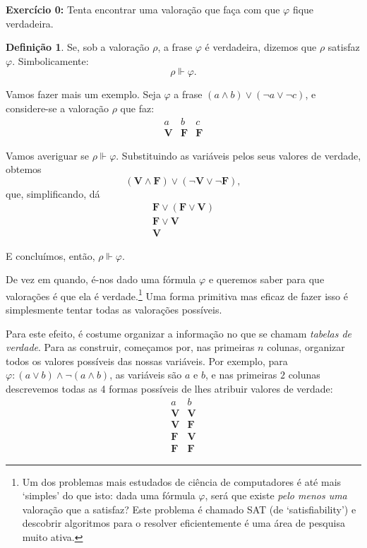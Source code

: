 \documentclass{article}
\theoremstyle{definition}
\newtheorem{definicao}{Definição}
\theoremstyle{remark}
\newcommand{\V}{\mathbf{V}}
\newcommand{\F}{\mathbf{F}}
\begin{document}
	\textbf{Exercício 0:} Tenta encontrar uma valoração que faça com que $\varphi$ fique verdadeira.
	
	\begin{definicao}
	Se, sob a valoração $\rho$, a frase $\varphi$ é verdadeira, dizemos que $\rho$ satisfaz $\varphi$. Simbolicamente:
	\[\rho \Vdash \varphi.\]
	\end{definicao}
	
	Vamos fazer mais um exemplo. Seja $\varphi$ a frase $(a \land b) \lor (\neg a \lor \neg c)$, e considere-se a valoração $\rho$ que faz:
	\[
	\begin{array}{c|c|c}
	a & b & c\\
	\hline
	\V & \F & \F
	\end{array}
	\]
	
	Vamos averiguar se $\rho \Vdash \varphi$. Substituindo as variáveis pelos seus valores de verdade, obtemos
	\[(\V \land \F) \lor (\neg \V \lor \neg \F),\]
	que, simplificando, dá
	\begin{gather*}
	\F \lor (\F \lor \V)\\
	\F \lor \V\\
	\V
	\end{gather*}
	
	E concluímos, então, $\rho \Vdash \varphi$.
	
	\smallskip
	
	De vez em quando, é-nos dado uma fórmula $\varphi$ e queremos saber para que valorações é que ela é verdade.\footnote{Um dos problemas mais estudados de ciência de computadores é até mais `simples' do que isto: dada uma fórmula $\varphi$, será que existe \emph{pelo menos uma} valoração que a satisfaz? Este problema é chamado SAT (de `satisfiability') e descobrir algoritmos para o resolver eficientemente é uma área de pesquisa muito ativa.} Uma forma primitiva mas eficaz de fazer isso é simplesmente tentar todas as valorações possíveis.
	
	Para este efeito, é costume organizar a informação no que se chamam \emph{tabelas de verdade}. Para as construir, começamos por, nas primeiras $n$ colunas, organizar todos os valores possíveis das nossas variáveis. Por exemplo, para $\varphi: (a \lor b) \land \neg (a \land b)$, as variáveis são $a$ e $b$, e nas primeiras $2$ colunas descrevemos todas as 4 formas possíveis de lhes atribuir valores de verdade:
	\[
	\begin{array}{c|c}
	a & b\\
	\hline
	\V & \V\\
	\V & \F\\
	\F & \V\\
	\F & \F
	\end{array}
	\]
	
\end{document}
